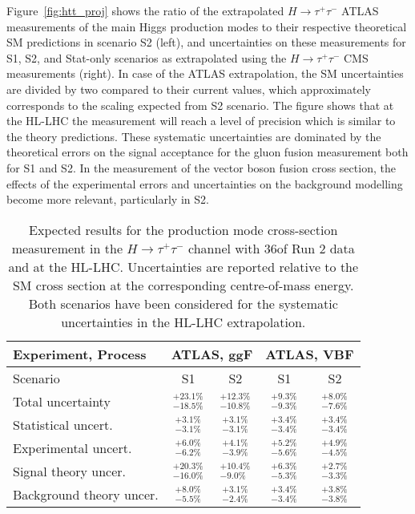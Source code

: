 Figure~\ref{fig:htt_proj} shows the ratio of the extrapolated $H \to \tau^{+}\tau^{-}$ ATLAS measurements of the main Higgs production modes to their respective theoretical SM predictions in scenario S2 (left), and uncertainties on these measurements for S1, S2, and Stat-only scenarios as extrapolated using the $H \to \tau^{+}\tau^{-}$ CMS measurements (right).
In case of the ATLAS extrapolation, the SM uncertainties are divided by two compared to their current values, which approximately corresponds to the scaling expected from S2 scenario. The figure shows that at the HL-LHC the measurement will reach a level of precision which is  similar to the theory predictions. These systematic uncertainties are dominated by the theoretical errors on the signal acceptance for the gluon fusion measurement both for S1 and S2. In the measurement of the vector boson fusion cross section, the effects of the experimental errors and uncertainties on the background modelling become more relevant, particularly in S2. 
\begin{table}[th!]
\begin{center}
\renewcommand{\arraystretch}{1.5}
{
\caption{Expected results for the production mode cross-section measurement in the $H\to \tau^{+} \tau^{-}$ channel with 36\fbinv of Run 2 data and at the HL-LHC. Uncertainties are reported relative to the SM cross section at the corresponding centre-of-mass energy. Both scenarios have been considered for the systematic uncertainties in the HL-LHC extrapolation.}
\label{tab:htt_proj}
\begin{tabular}{l | c c c c}
\hline\hline
Experiment, Process & \multicolumn{2}{c}{ATLAS, ggF}& \multicolumn{2}{c}{ATLAS, VBF}\\ 
\hline
Scenario &  S1 & S2 & S1 & S2  \\
Total uncertainty   & $^{+23.1\%}_{-18.5\%}$& $^{+12.3\%}_{-10.8\%}$  & $^{+9.3\%}_{-9.3\%}$ & $^{+8.0\%}_{-7.6\%}$ \\
\hline
Statistical uncert.  & $^{+3.1\%}_{-3.1\%}$ & $^{+3.1\%}_{-3.1\%}$  & $^{+3.4\%}_{-3.4\%}$ & $^{+3.4\%}_{-3.4\%}$\\
Experimental uncert. & $^{+6.0\%}_{-6.2\%}$ & $^{+4.1\%}_{-3.9\%}$  & $^{+5.2\%}_{-5.6\%}$ & $^{+4.9\%}_{-4.5\%}$ \\
Signal theory uncer. & $^{+20.3\%}_{-16.0\%}$ & $^{+10.4\%}_{-9.0\%}$ & $^{+6.3\%}_{-5.3\%}$ & $^{+2.7\%}_{-3.3\%}$\\
Background theory uncer. & $^{+8.0\%}_{-5.5\%}$ & $^{+3.1\%}_{-2.4\%}$ & $^{+3.4\%}_{-3.4\%}$ & $^{+3.8\%}_{-3.8\%}$\\
\hline\hline
\end{tabular}
} %
\end{center}
\end{table}

